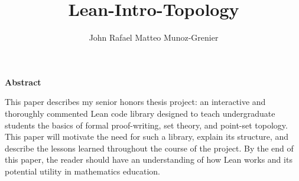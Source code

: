 \documentclass[11pt, oneside]{book}
\title{Lean-Intro-Topology}
\author{John Rafael Matteo Munoz-Grenier}
\begin{document}
\frontmatter
\maketitle

\newpage
{
  \vfill
  \LARGE 
  \textbf{Abstract}
  \normalsize


  This paper describes my senior honors thesis project:
  an interactive and thoroughly commented Lean code library designed
  to teach undergraduate students the basics of formal proof-writing, 
  set theory, and point-set topology. This paper will motivate the need 
  for such a library, explain its structure, and describe the lessons 
  learned throughout the course of the project. By the end of this paper,
  the reader should have an understanding of how Lean works and its
  potential utility in mathematics education.

  \vfill
}
\tableofcontents

\mainmatter





\end{document}

